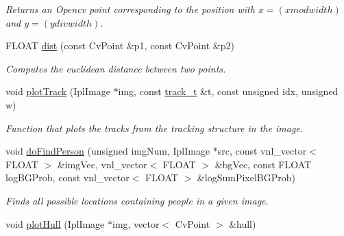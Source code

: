 \begin{DoxyCompactItemize}
\begin{DoxyCompactList}\small\item\em Returns an Opencv point corresponding to the position with $ x = (x mod width)$ and $ y = (y div width)$. \item\end{DoxyCompactList}\item 
\hypertarget{classfindPersonStream_a400f30b8f239fae9c9b767fb6ecc1d3f}{
FLOAT \hyperlink{classfindPersonStream_a400f30b8f239fae9c9b767fb6ecc1d3f}{dist} (const CvPoint \&p1, const CvPoint \&p2)}
\label{classfindPersonStream_a400f30b8f239fae9c9b767fb6ecc1d3f}

\begin{DoxyCompactList}\small\item\em Computes the euclidean distance between two points. \item\end{DoxyCompactList}\item 
\hypertarget{classfindPersonStream_abbe593e6141fbed267f5c2cac102edfe}{
void \hyperlink{classfindPersonStream_abbe593e6141fbed267f5c2cac102edfe}{plotTrack} (IplImage $\ast$img, const \hyperlink{structtrack__t}{track\_\-t} \&t, const unsigned idx, unsigned w)}
\label{classfindPersonStream_abbe593e6141fbed267f5c2cac102edfe}

\begin{DoxyCompactList}\small\item\em Function that plots the tracks from the tracking structure in the image. \item\end{DoxyCompactList}\item 
\hypertarget{classfindPersonStream_a1637d37496d22236ac356d63ced3a67c}{
void \hyperlink{classfindPersonStream_a1637d37496d22236ac356d63ced3a67c}{doFindPerson} (unsigned imgNum, IplImage $\ast$src, const vnl\_\-vector$<$ FLOAT $>$ \&imgVec, vnl\_\-vector$<$ FLOAT $>$ \&bgVec, const FLOAT logBGProb, const vnl\_\-vector$<$ FLOAT $>$ \&logSumPixelBGProb)}
\label{classfindPersonStream_a1637d37496d22236ac356d63ced3a67c}

\begin{DoxyCompactList}\small\item\em Finds all possible locations containing people in a given image. \item\end{DoxyCompactList}\item 
\hypertarget{classfindPersonStream_aa51b2586e2fc41b010b6d4b1a4c4beb4}{
void \hyperlink{classfindPersonStream_aa51b2586e2fc41b010b6d4b1a4c4beb4}{plotHull} (IplImage $\ast$img, vector$<$ CvPoint $>$ \&hull)}
\label{classfindPersonStream_aa51b2586e2fc41b010b6d4b1a4c4beb4}


\end{DoxyCompactItemize}
